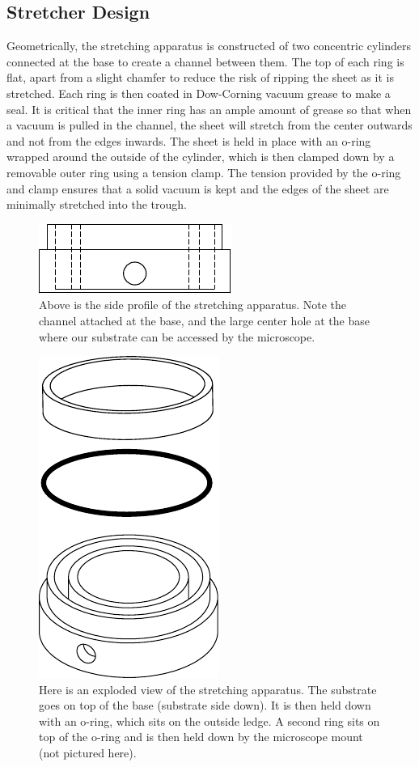 \subsection{Stretcher Design}
Geometrically, the stretching apparatus is constructed of two concentric cylinders connected at the base to create a channel between them. The top of each ring is flat, apart from a slight chamfer to reduce the risk of ripping the sheet as it is stretched. Each ring is then coated in Dow-Corning vacuum grease to make a seal. It is critical that the inner ring has an ample amount of grease so that when a vacuum is pulled in the channel, the sheet will stretch from the center outwards  and not from the edges inwards. The sheet is held in place with an o-ring wrapped around the outside of the cylinder, which is then clamped down by a removable outer ring using a tension clamp. The tension provided by the o-ring and clamp ensures that a solid vacuum is kept and the edges of the sheet are minimally stretched into the trough.
\begin{figure}[h!]
	\centering
	\includegraphics[width=0.6\linewidth]{Chapters/Figures/stretcher_side}
	\caption[Side Profile of Stretching Apparatus]{Above is the side profile of the stretching apparatus. Note the channel attached at the base, and the large center hole at the base where our substrate can be accessed by the microscope.}
	\label{fig:stretcherside}
\end{figure}

\begin{figure}[h!]
	\centering
	\includegraphics[width=.35\linewidth]{Chapters/Figures/exploded_stretcher}
	\caption[Stretching Apparatus Design]{Here is an exploded view of the stretching apparatus. The substrate goes on top of the base (substrate side down). It is then held down with an o-ring, which sits on the outside ledge. A second ring sits on top of the o-ring and is then held down by the microscope mount (not pictured here).}
	\label{fig:explodedstretcher}
\end{figure}


